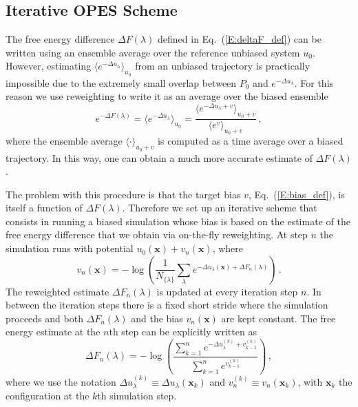 \documentclass[aps,prx,reprint,superscriptaddress]{revtex4-1} %
\begin{document}
\subsection{Iterative OPES Scheme\label{S:iterative}}
The free energy difference $\Delta F(\lambda)$ defined in Eq.~(\ref{E:deltaF_def}) can be written using an ensemble average over the reference unbiased system $u_0$\cite{Zwanzig1954}.
However, estimating $\langle e^{-\Delta u_\lambda}\rangle_{u_0}$ from an unbiased trajectory is practically impossible due to the extremely small overlap between $P_0$ and $e^{-\Delta u_\lambda}$.
For this reason we use reweighting to write it as an average over the biased ensemble
\begin{equation}\label{E:deltaF_rew}
    e^{-\Delta F(\lambda)}=\langle e^{-\Delta u_\lambda }\rangle_{u_0}=\frac{\langle e^{-\Delta u_\lambda +v} \rangle_{u_0+v}}{\langle e^{v}\rangle_{u_0+v}}\, ,
\end{equation}
where the ensemble average $\langle \cdot \rangle_{u_0+v}$ is computed as a time average over a biased trajectory.
In this way, one can obtain a much more accurate estimate of $\Delta F(\lambda)$.

The problem with this procedure is that the target bias $v$, Eq.~(\ref{E:bias_def}), is itself a function of $\Delta F(\lambda)$.
Therefore we set up an iterative scheme that consists in running a biased simulation whose bias is based on the estimate of the free energy difference that we obtain via on-the-fly reweighting.
At step $n$ the simulation runs with potential $u_0(\mathbf{x})+v_n(\mathbf{x})$, where
\begin{equation}\label{E:bias_n}
    v_n(\mathbf{x})=-\log \left(\frac{1}{N_{\{\lambda\}}}\sum_\lambda e^{-\Delta u_\lambda(\mathbf{x})+\Delta F_n(\lambda)}\right)\, .
\end{equation}
The reweighted estimate $\Delta F_n(\lambda)$ is updated at every iteration step $n$.
In between the iteration steps there is a fixed short stride where the simulation proceeds and both $\Delta F_n(\lambda)$ and the bias $v_n(\mathbf{x})$ are kept constant.
The free energy estimate at the $n$th step can be explicitly written as
\begin{equation}\label{E:deltaF_n}
    \Delta F_n(\lambda)=-\log \left (\frac{\sum\limits_{k=1}^n e^{-\Delta u_\lambda^{(k)}+v_{k-1}^{(k)}}}{\sum\limits_{k=1}^n e^{v_{k-1}^{(k)}}} \right ) \, ,
\end{equation}
where we use the notation $\Delta u_\lambda^{(k)} \equiv \Delta u_\lambda(\mathbf{x}_k)$ and $v_n^{(k)}\equiv v_n(\mathbf{x}_k)$, with $\mathbf{x}_k$ the configuration at the $k$th simulation step.
\end{document}
